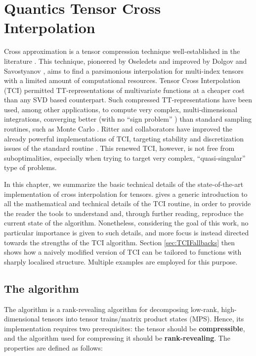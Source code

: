 \chapter{Quantics Tensor Cross Interpolation}
\label{chap:QTCI}

Cross approximation is a tensor compression technique well-established in the literature \cite{Oseledets2010, Dolgov2020, Savostyanov2011, Savostyanov2014, Fernandez2022, Fernandez2024}. This technique, pioneered by Oseledets \cite{Oseledets2010} and improved by Dolgov and Savostyanov \cite{Dolgov2020}, aims to find a parsimonious interpolation for multi-index tensors with a limited amount of computational resources. Tensor Cross Interpolation (TCI) permitted TT-representations of multivariate functions at a cheaper cost than any SVD based counterpart. Such compressed TT-representations have been used, among other applications, to compute very complex, multi-dimensional integrations, converging better (with no ``sign problem'' \cite{Loh1990}) than standard sampling routines, such as Monte Carlo \cite{Fernandez2022, Dolgov2020}. Ritter and collaborators have improved the already powerful implementations of TCI, targeting stability and discretization issues of the standard routine \cite{Fernandez2024}. This renewed TCI, however, is not free from suboptimalities, especially when trying to target very complex, ``quasi-singular'' type of problems. 

In this chapter, we summarize the basic technical details of the state-of-the-art implementation of cross interpolation for tensors.  gives a generic introduction to all the mathematical and technical details of the TCI routine, in order to provide the reader the tools to understand and, through further reading, reproduce the current state of the algorithm. Nonetheless, considering the goal of this work, no particular importance is given to such details, and more focus is instead directed towards the strengths of the TCI algorithm. Section \ref{sec:TCIFallbacks} then shows how a naively modified version of TCI can be tailored to functions with sharply localised structure. Multiple examples are employed for this purpose.

\section{The algorithm}
\label{sec:TCIalgorithm}

The algorithm is a rank-revealing algorithm for decomposing low-rank, high-dimensional tensors into tensor trains/matrix product states (MPS). Hence, its implementation requires two prerequisites: the tensor should be \textbf{compressible}, and the algorithm used for compressing it should be \textbf{rank-revealing}. The properties are defined as follows:

